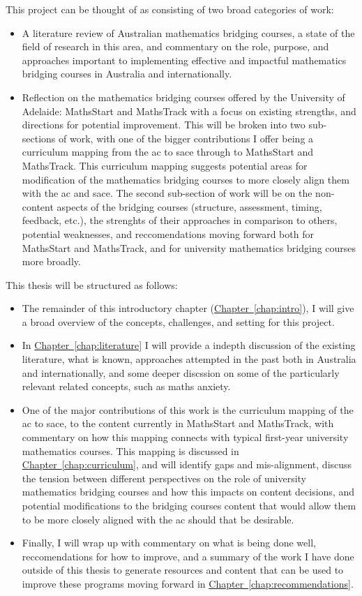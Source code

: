 \documentclass[twoside,12pt,a4paper]{report}
\newcommand{\refchap}[1]{\hyperref[chap:#1]{Chapter~\ref{chap:#1}}}
\begin{document}
This project can be thought of as consisting of two broad categories of work:
\begin{itemize}
	\item A literature review of Australian mathematics bridging courses, a state of the field of research in this area, and commentary on the role, purpose, and approaches important to implementing effective and impactful mathematics bridging courses in Australia and internationally.
	\item Reflection on the  mathematics bridging courses offered by the University of Adelaide: MathsStart and MathsTrack with a focus on existing strengths, and directions for potential improvement. This will be broken into two sub-sections of work, with one of the bigger contributions I offer being a curriculum mapping from the \gls{ac} to \gls{sace} through to MathsStart and MathsTrack. This curriculum mapping suggests potential areas for modification of the mathematics bridging courses to more closely align them with the \gls{ac} and \gls{sace}. The second sub-section of work will be on the non-content aspects of the bridging courses (structure, assessment, timing, feedback, etc.), the strenghts of their approaches in comparison to others, potential weaknesses, and reccomendations moving forward both for MathsStart and MathsTrack, and for university mathematics bridging courses more broadly.
\end{itemize}

This thesis will be structured as follows:
\begin{itemize}
	\item The remainder of this introductory chapter (\refchap{intro}), I will give a broad overview of the concepts, challenges, and setting for this project.
	\item In \refchap{literature} I will provide a indepth discussion of the existing literature, what is known, approaches attempted in the past both in Australia and internationally, and some deeper discssion on some of the particularly relevant related concepts, such as maths anxiety.
	\item One of the major contributions of this work is the curriculum mapping of the \gls{ac} to \gls{sace}, to the content currently in MathsStart and MathsTrack, with commentary on how this mapping connects with typical first-year university mathematics courses. This mapping is discussed in \refchap{curriculum}, and will identify gaps and mis-alignment, discuss the tension between different perspectives on the role of university mathematics bridging courses and how this impacts on content decisions, and potential modifications to the bridging courses content that would allow them to be more closely aligned with the \gls{ac} should that be desirable.
	\item Finally, I will wrap up with commentary on what is being done well, reccomendations for how to improve, and a summary of the work I have done outside of this thesis to generate resources and content that can be used to improve these programs moving forward in \refchap{recommendations}.
\end{itemize}
\end{document}
